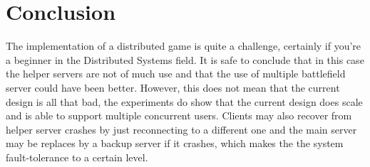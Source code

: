 \section{Conclusion}
The implementation of a distributed game is quite a challenge, certainly if you're a beginner in the Distributed Systems field.
It is safe to conclude that in this case the helper servers are not of much use and that the use of multiple battlefield server could have been better.
However, this does not mean that the current design is all that bad, the experiments do show that the current design does scale and is able to support multiple concurrent users.
Clients may also recover from helper server crashes by just reconnecting to a different one and the main server may be replaces by a backup server if it crashes, which makes the the system fault-tolerance to a certain level.

  
